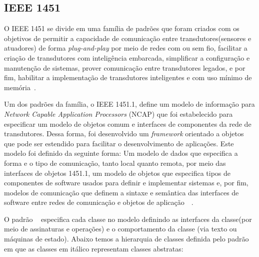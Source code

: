 \subsection{IEEE 1451}
O IEEE 1451 se divide em uma família de padrões que foram criados com os objetivos de permitir a capacidade de comunicação entre transdutores(sensores e atuadores) de forma \emph{plug-and-play} por meio de redes com ou sem fio, facilitar a criação de transdutores com inteligência embarcada, simplificar a configuração e manutenção de sistemas, prover comunicação entre transdutores legados, e por fim, habilitar a implementação de transdutores inteligentes e com uso mínimo de memória~\cite{ieee1451journal}.

Um dos padrões da família, o IEEE 1451.1, define um modelo de informação para \emph{Network Capable Application Processors} (NCAP) que foi estabelecido para especificar um modelo de objetos comum e interfaces de componentes da rede de transdutores. Dessa forma, foi desenvolvido um \emph{framework} orientado a objetos que pode ser estendido para facilitar o desenvolvimento de aplicações. Este modelo foi definido da seguinte forma: Um modelo de dados que especifica a forma e o tipo de comunicação, tanto local quanto remota, por meio das interfaces de objetos 1451.1, um modelo de objetos que especifica tipos de componentes de software usados para definir e implementar sistemas e, por fim, modelos de comunicação que definem a sintaxe e semântica das interfaces de software entre redes de comunicação e objetos de aplicação~\cite{ieeeOO1451}~\cite{ieee1451monitoring}.


O padrão ~\cite{ieee1451standard} especifica cada classe no modelo definindo as interfaces da classe(por meio de assinaturas e operações) e o comportamento da classe (via texto ou máquinas de estado). Abaixo temos a hierarquia de classes definida pelo padrão em que as classes em itálico representam classes abstratas:

